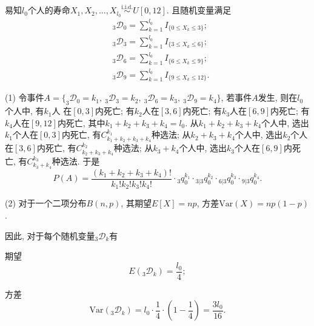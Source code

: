 \documentclass[a4paper,openany, 10pt]{ctexbook}
\begin{document}
\solution
易知$l_{0}$个人的寿命$X_{1},X_{2},...,X_{l_{0}}\stackrel{\text{i.i.d.}}{\sim}U[0,12]$. 且随机变量满足
\begin{align*}
  &{}_{3}\mathscr D _{0}=\sum^{l_{0}}_{k=1}I_{\{0\leq X_k \leq 3\}};\\
&{}_{3}\mathscr D _{3}=\sum^{l_{0}}_{k=1}I_{\{3\leq X_k \leq 6\}};\\
&{}_{3}\mathscr D _{6}=\sum^{l_{0}}_{k=1}I_{\{6\leq X_k \leq 9\}};\\
&{}_{3}\mathscr D _{9}=\sum^{l_{0}}_{k=1}I_{\{9\leq X_k \leq 12\}}.
\end{align*}

\noindent(1) 令事件$A=\{_{3}\mathscr D _{0}=k_{1},\ _{3}\mathscr D _{3}=k_{2},\ _{3}\mathscr D _{6}=k_{3},\ _{3}\mathscr D _{9}=k_{4}\}$, 若事件$A$发生, 则在$l_{0}$个人中, 有$k_{1}$人
在$[0,3]$内死亡; 有$k_{2}$人在$[3,6]$内死亡; 有$k_{3}$人在$[6,9]$内死亡; 有$k_{4}$人在$[9,12]$内死亡, 其中$k_{1}+k_{2}+k_{3}+k_{4}=l_{0}.$ 从$k_{1}+k_{2}+k_{3}+k_{4}$个人中, 选出$k_{1}$个人在$[0,3]$内死亡, 有$C_{k_{1}+k_{2}+k_{3}+k_{4}}^{k_{1}}$种选法; 从$k_{2}+k_{3}+k_{4}$个人中, 选出$k_{2}$个人在$[3,6]$内死亡, 有$C_{k_{2}+k_{3}+k_{4}}^{k_{2}}$种选法; 从$k_{3}+k_{4}$个人中, 选出$k_{3}$个人在$[6,9]$内死亡, 有$C_{k_{3}+k_{4}}^{k_{3}}$种选法. 于是
$$
    P(A)=\frac{(k_{1}+k_{2}+k_{3}+k_{4})!}{k_{1}!k_{2}!k_{3}!k_{4}!}\cdot {}_{3}q_{0}^{k_{1}}\cdot {}_{3|3}q_{0}^{k_{2}}\cdot {}_{6|3}q_{0}^{k_{3}}\cdot {}_{9|3}q_{0}^{k_{4}}.
$$

\noindent(2) 对于一个二项分布$B(n, p)$, 其期望$E[X] = np$, 方差$\text{Var}(X) = np(1-p)$.

因此, 对于每个随机变量$_{3}\mathscr D_{k}$有

期望 $$E(_{3}\mathscr D_{k}) = \frac{l_0}{4};$$

方差 $$\text{Var}(_{3}\mathscr D_{k}) = l_0 \cdot \frac{1}{4} \cdot \left(1 - \frac{1}{4}\right) = \frac{3l_0}{16}.$$
\end{document}
